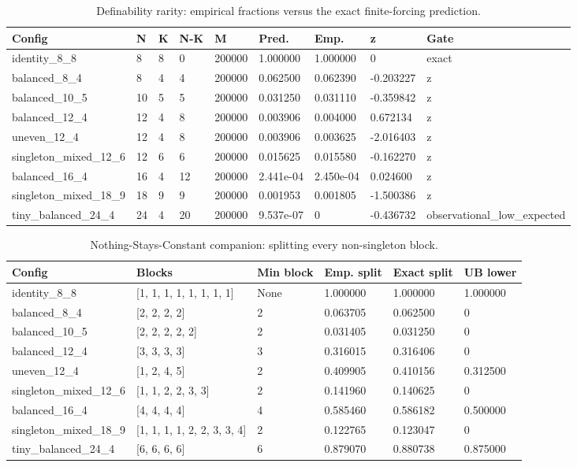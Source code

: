 \begin{table}[t]
\centering
\small
\caption{Definability rarity: empirical fractions versus the exact finite-forcing prediction.}
\label{tab:definability-rarity}
\begin{tabular}{@{}lllllllll@{}}
\toprule
Config & N & K & N-K & M & Pred. & Emp. & z & Gate \\
\midrule
identity\_8\_8 & 8 & 8 & 0 & 200000 & 1.000000 & 1.000000 & 0 & exact \\
balanced\_8\_4 & 8 & 4 & 4 & 200000 & 0.062500 & 0.062390 & -0.203227 & z \\
balanced\_10\_5 & 10 & 5 & 5 & 200000 & 0.031250 & 0.031110 & -0.359842 & z \\
balanced\_12\_4 & 12 & 4 & 8 & 200000 & 0.003906 & 0.004000 & 0.672134 & z \\
uneven\_12\_4 & 12 & 4 & 8 & 200000 & 0.003906 & 0.003625 & -2.016403 & z \\
singleton\_mixed\_12\_6 & 12 & 6 & 6 & 200000 & 0.015625 & 0.015580 & -0.162270 & z \\
balanced\_16\_4 & 16 & 4 & 12 & 200000 & 2.441e-04 & 2.450e-04 & 0.024600 & z \\
singleton\_mixed\_18\_9 & 18 & 9 & 9 & 200000 & 0.001953 & 0.001805 & -1.500386 & z \\
tiny\_balanced\_24\_4 & 24 & 4 & 20 & 200000 & 9.537e-07 & 0 & -0.436732 & observational\_low\_expected \\
\bottomrule
\end{tabular}
\end{table}
\begin{table}[t]
\centering
\small
\caption{Nothing-Stays-Constant companion: splitting every non-singleton block.}
\label{tab:definability-rarity-splitting}
\begin{tabular}{@{}llllll@{}}
\toprule
Config & Blocks & Min block & Emp. split & Exact split & UB lower \\
\midrule
identity\_8\_8 & [1, 1, 1, 1, 1, 1, 1, 1] & None & 1.000000 & 1.000000 & 1.000000 \\
balanced\_8\_4 & [2, 2, 2, 2] & 2 & 0.063705 & 0.062500 & 0 \\
balanced\_10\_5 & [2, 2, 2, 2, 2] & 2 & 0.031405 & 0.031250 & 0 \\
balanced\_12\_4 & [3, 3, 3, 3] & 3 & 0.316015 & 0.316406 & 0 \\
uneven\_12\_4 & [1, 2, 4, 5] & 2 & 0.409905 & 0.410156 & 0.312500 \\
singleton\_mixed\_12\_6 & [1, 1, 2, 2, 3, 3] & 2 & 0.141960 & 0.140625 & 0 \\
balanced\_16\_4 & [4, 4, 4, 4] & 4 & 0.585460 & 0.586182 & 0.500000 \\
singleton\_mixed\_18\_9 & [1, 1, 1, 1, 2, 2, 3, 3, 4] & 2 & 0.122765 & 0.123047 & 0 \\
tiny\_balanced\_24\_4 & [6, 6, 6, 6] & 6 & 0.879070 & 0.880738 & 0.875000 \\
\bottomrule
\end{tabular}
\end{table}
